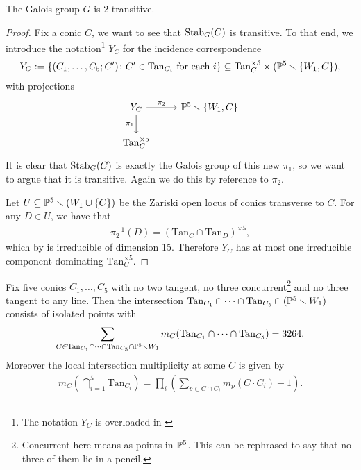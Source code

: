 \documentclass[11pt]{amsart}
\providecommand{\Tan}{\mathrm{Tan}}
\begin{document}
\begin{proposition} The Galois group $G$ is $2$-transitive.
\end{proposition}
\begin{proof} Fix a conic $C$, we want to see that $\Stab_G(C)$ is transitive. To that end, we introduce the notation\footnote{The notation $Y_C$ is overloaded in \cite[\S~IV]{Harris-Galois}} $Y_C$ for the incidence correspondence
\begin{align*}
    Y_C := \left\{ (C_1, \ldots, C_5 ; C') \colon C' \in \Tan_{C_i} \text{ for each }i \right\} \subseteq \Tan_C^{\times 5} \times (\P^5 \minus \left\{ W_1, C\right\}),
\end{align*}
with projections
\[ \begin{tikzcd}
    Y_C\dar["\pi_1" left]\rar["\pi_2" above] & {\P^5\minus\{W_1,C\}}\\
    \Tan_C^{\times 5} & 
\end{tikzcd} \]
It is clear that $\Stab_G(C)$ is exactly the Galois group of this new $\pi_1$, so we want to argue that it is transitive. Again we do this by reference to $\pi_2$.

Let $U \subseteq \P^5 \minus (W_1 \cup \left\{ C \right\})$ be the Zariski open locus of conics transverse to $C$. For any $D\in U$, we have that
\begin{align*}
    \pi_2^{-1}(D) = (\Tan_C \cap \Tan_D)^{\times 5},
\end{align*}
which by  is irreducible of dimension 15. Therefore $Y_C$ has at most one irreducible component dominating $\Tan_C^{\times5}$.
\end{proof}

\begin{proposition} Fix five conics $C_1, \ldots, C_5$ with no two tangent, no three concurrent\footnote{Concurrent here means as points in $\P^5$. This can be rephrased to say that no three of them lie in a pencil.} and no three tangent to any line. Then the intersection $\Tan_{C_1} \cap \cdots \cap \Tan_{C_5} \cap (\P^5 \minus W_1)$ consists of isolated points with
\begin{align*}
    \sum_{C \in \Tan_{C_1} \cap \cdots \cap \Tan_{C_5}\cap \P^5\minus W_1} m_C(\Tan_{C_1} \cap \cdots \cap \Tan_{C_5}) = 3264.
\end{align*}
Moreover the local intersection multiplicity at some $C$ is given by
\begin{align*}
    m_C \left( \bigcap_{i=1}^5 \Tan_{C_i}\right) = \prod_i \left( \sum_{p\in C\cap C_i} m_p(C \cdot C_i)-1 \right).
\end{align*}
\end{proposition}
\end{document}
